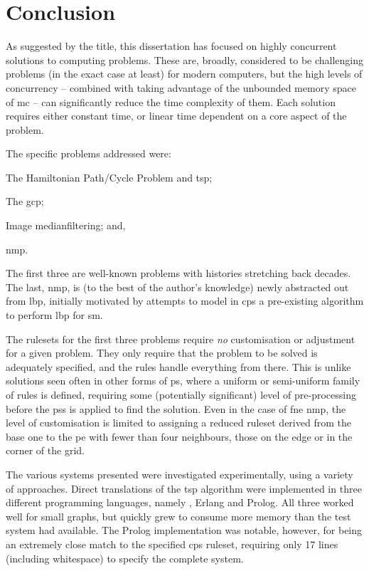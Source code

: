 \chapter{\label{chap:conc}Conclusion}

As suggested by the title, this dissertation has focused on highly concurrent solutions to computing problems.  These are, broadly, considered to be challenging problems (in the exact case at least) for modern computers, but the high levels of concurrency -- combined with taking advantage of the unbounded memory space of \gls{mc} -- can significantly reduce the time complexity of them.  Each solution requires either constant time, or linear time dependent on a core aspect of the problem.

The specific problems addressed were:
\begin{inparaenum}[(1)]
\item The Hamiltonian Path/Cycle Problem and \gls{tsp};
\item The \gls{gcp};
\item Image \gls{medianfilter}ing; and,
\item \gls{nmp}.
\end{inparaenum}
The first three are well-known problems with histories stretching back decades.  The last, \gls{nmp}, is (to the best of the author's knowledge) newly abstracted out from \gls{lbp}, initially motivated by attempts to model in \gls{cps} a pre-existing algorithm to perform \gls{lbp} for \gls{sm}.

The \glspl{ruleset} for the first three problems require \emph{no} customisation or adjustment for a given problem.  They only require that the problem to be solved is adequately specified, and the rules handle everything from there.  This is unlike solutions seen often in other forms of \gls{ps}, where a uniform or semi-uniform family of rules is defined, requiring some (potentially significant) level of pre-processing before the \glspl{ps} is applied to find the solution.  Even in the case of \gls{fne} \gls{nmp}, the level of customisation is limited to assigning a reduced \gls{ruleset} derived from the base one to the \gls{pe} with fewer than four neighbours, \ie{} those on the edge or in the corner of the grid.

The various systems presented were investigated experimentally, using a variety of approaches.  Direct translations of the \gls{tsp} algorithm were implemented in three different programming languages, namely \fsharp{}, Erlang and Prolog.  All three worked well for small graphs, but quickly grew to consume more memory than the test system had available.  The Prolog implementation was notable, however, for being an extremely close match to the specified \gls{cps} \gls{ruleset}, requiring only 17 lines (including whitespace) to specify the complete system.


